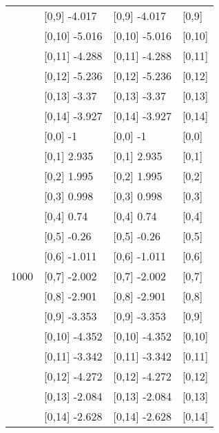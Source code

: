 \begin{table}
\begin{tabular}[t]{llll}
 & {}[0,9] -4.017 & {}[0,9] -4.017 & {}[0,9]\\
\addlinespace
 & {}[0,10] -5.016 & {}[0,10] -5.016 & {}[0,10]\\
 & {}[0,11] -4.288 & {}[0,11] -4.288 & {}[0,11]\\
 & {}[0,12] -5.236 & {}[0,12] -5.236 & {}[0,12]\\
 & {}[0,13] -3.37 & {}[0,13] -3.37 & {}[0,13]\\
 & {}[0,14] -3.927 & {}[0,14] -3.927 & {}[0,14]\\
\addlinespace
 & {}[0,0] -1 & {}[0,0] -1 & {}[0,0]\\
 & {}[0,1] 2.935 & {}[0,1] 2.935 & {}[0,1]\\
 & {}[0,2] 1.995 & {}[0,2] 1.995 & {}[0,2]\\
 & {}[0,3] 0.998 & {}[0,3] 0.998 & {}[0,3]\\
 & {}[0,4] 0.74 & {}[0,4] 0.74 & {}[0,4]\\
\addlinespace
 & {}[0,5] -0.26 & {}[0,5] -0.26 & {}[0,5]\\
 & {}[0,6] -1.011 & {}[0,6] -1.011 & {}[0,6]\\
1000 & {}[0,7] -2.002 & {}[0,7] -2.002 & {}[0,7]\\
 & {}[0,8] -2.901 & {}[0,8] -2.901 & {}[0,8]\\
 & {}[0,9] -3.353 & {}[0,9] -3.353 & {}[0,9]\\
\addlinespace
 & {}[0,10] -4.352 & {}[0,10] -4.352 & {}[0,10]\\
 & {}[0,11] -3.342 & {}[0,11] -3.342 & {}[0,11]\\
 & {}[0,12] -4.272 & {}[0,12] -4.272 & {}[0,12]\\
 & {}[0,13] -2.084 & {}[0,13] -2.084 & {}[0,13]\\
 & {}[0,14] -2.628 & {}[0,14] -2.628 & {}[0,14]\\
\bottomrule
\end{tabular}
\end{table}
